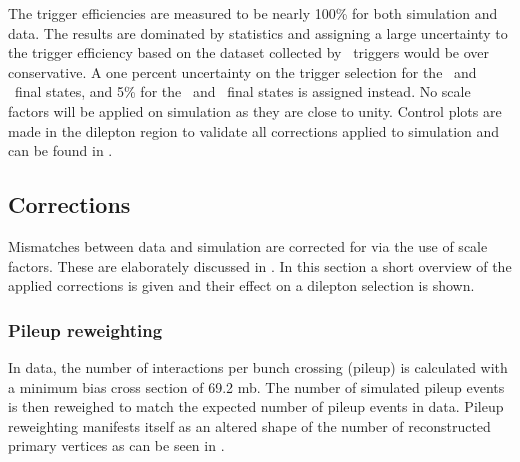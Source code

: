 The trigger efficiencies are measured to be nearly 100\% for both simulation and data. The results are dominated by statistics and assigning a large uncertainty to the trigger efficiency based on the dataset collected by \Etmis\ triggers would be over conservative. A one percent uncertainty on the trigger selection for the \eemu\ and \mumumu\ final states, and 5\% for the \eee\ and \emumu\ final states is assigned instead. No scale factors will be applied on simulation as they are close to unity. Control plots are made in the dilepton region to validate all corrections applied to simulation and can be found in  .

\subsection{Corrections}
\label{sec:corrections}
Mismatches between data and simulation are corrected for via the use of scale factors. These are elaborately discussed in . In this section a short overview of the applied corrections is given and their effect on a dilepton selection is shown. 

\subsubsection*{Pileup reweighting}
In data, the number of interactions per bunch crossing (pileup) is calculated with a minimum bias cross section of 69.2 mb. The number of simulated pileup events is then reweighed to match the expected number of pileup events in data. Pileup reweighting manifests itself as an altered shape of the number of reconstructed primary vertices as can be seen in .

